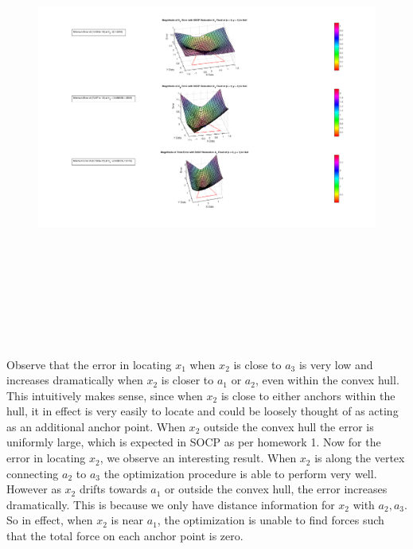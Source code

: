 \documentclass{article} %
\begin{document}
\begin{itemize}
\begin{figure}[H]
\centering
\includegraphics[width=\textwidth,height=15cm]{SOCP_Centerhull.png}
\end{figure}


Observe that the error in locating $x_1$ when $x_2$ is close to $a_3$ is very low and increases dramatically when $x_2$ is closer to $a_1$ or $a_2$, even within the convex hull. This intuitively makes sense, since when $x_2$ is close to either anchors within the hull, it in effect is very easily to locate and could be loosely thought of as acting as an additional anchor point. When $x_2$ outside the convex hull the error is uniformly large, which is expected in SOCP as per homework 1.  Now for the error in locating $x_2$, we observe an interesting result. When $x_2$ is along the vertex connecting $a_2$ to $a_3$ the optimization procedure is able to perform very well. However as $x_2$ drifts towards $a_1$ or outside the convex hull, the error increases dramatically. This is because we only have distance information for $x_2$ with $a_2,a_3$. So in effect, when $x_2$ is near $a_1$, the optimization is unable to find forces such that the total force on each anchor point is zero. 


\end{itemize}
\end{document}
